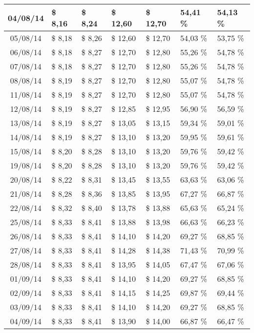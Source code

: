 \begin{center}
\begin{longtable}{|c|p{1.5cm}|p{1.5cm}|p{1.5cm}|p{1.5cm}|p{1.5cm}|p{1.5cm}|}
04/08/14 & \$ 8,16 & \$ 8,24 & \$ 12,60 & \$ 12,70 & 54,41 \% & 54,13 \% \\ \hline
05/08/14 & \$ 8,18 & \$ 8,26 & \$ 12,60 & \$ 12,70 & 54,03 \% & 53,75 \% \\ \hline
06/08/14 & \$ 8,18 & \$ 8,27 & \$ 12,70 & \$ 12,80 & 55,26 \% & 54,78 \% \\ \hline
07/08/14 & \$ 8,18 & \$ 8,27 & \$ 12,70 & \$ 12,80 & 55,26 \% & 54,78 \% \\ \hline
08/08/14 & \$ 8,19 & \$ 8,27 & \$ 12,70 & \$ 12,80 & 55,07 \% & 54,78 \% \\ \hline
11/08/14 & \$ 8,19 & \$ 8,27 & \$ 12,70 & \$ 12,80 & 55,07 \% & 54,78 \% \\ \hline
12/08/14 & \$ 8,19 & \$ 8,27 & \$ 12,85 & \$ 12,95 & 56,90 \% & 56,59 \% \\ \hline
13/08/14 & \$ 8,19 & \$ 8,27 & \$ 13,05 & \$ 13,15 & 59,34 \% & 59,01 \% \\ \hline
14/08/14 & \$ 8,19 & \$ 8,27 & \$ 13,10 & \$ 13,20 & 59,95 \% & 59,61 \% \\ \hline
15/08/14 & \$ 8,20 & \$ 8,28 & \$ 13,10 & \$ 13,20 & 59,76 \% & 59,42 \% \\ \hline
19/08/14 & \$ 8,20 & \$ 8,28 & \$ 13,10 & \$ 13,20 & 59,76 \% & 59,42 \% \\ \hline
20/08/14 & \$ 8,22 & \$ 8,31 & \$ 13,45 & \$ 13,55 & 63,63 \% & 63,06 \% \\ \hline
21/08/14 & \$ 8,28 & \$ 8,36 & \$ 13,85 & \$ 13,95 & 67,27 \% & 66,87 \% \\ \hline
22/08/14 & \$ 8,32 & \$ 8,40 & \$ 13,78 & \$ 13,88 & 65,63 \% & 65,24 \% \\ \hline
25/08/14 & \$ 8,33 & \$ 8,41 & \$ 13,88 & \$ 13,98 & 66,63 \% & 66,23 \% \\ \hline
26/08/14 & \$ 8,33 & \$ 8,41 & \$ 14,10 & \$ 14,20 & 69,27 \% & 68,85 \% \\ \hline
27/08/14 & \$ 8,33 & \$ 8,41 & \$ 14,28 & \$ 14,38 & 71,43 \% & 70,99 \% \\ \hline
28/08/14 & \$ 8,33 & \$ 8,41 & \$ 13,95 & \$ 14,05 & 67,47 \% & 67,06 \% \\ \hline
01/09/14 & \$ 8,33 & \$ 8,41 & \$ 14,10 & \$ 14,20 & 69,27 \% & 68,85 \% \\ \hline
02/09/14 & \$ 8,33 & \$ 8,41 & \$ 14,15 & \$ 14,25 & 69,87 \% & 69,44 \% \\ \hline
03/09/14 & \$ 8,33 & \$ 8,41 & \$ 14,10 & \$ 14,20 & 69,27 \% & 68,85 \% \\ \hline
04/09/14 & \$ 8,33 & \$ 8,41 & \$ 13,90 & \$ 14,00 & 66,87 \% & 66,47 \% \\ \hline

\end{longtable}
\end{center}
